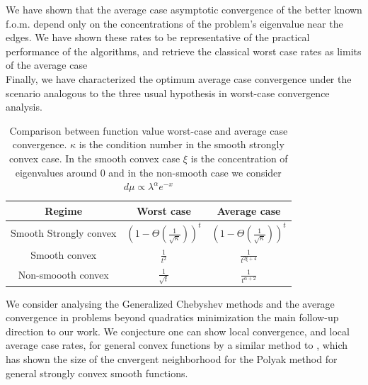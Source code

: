\documentclass{article}
\begin{document}
We have  shown that the average case asymptotic convergence of  the better known f.o.m. depend only on the concentrations of the problem's eigenvalue near the edges. We have shown these rates to be representative of the practical performance of the algorithms, and retrieve the classical worst case rates as limits of the average case\\

Finally, we have characterized the optimum average case convergence under the scenario analogous to the three usual hypothesis in worst-case convergence analysis.

\begin{table}[H]
    \centering
    \begin{tabular}{c|c|c}
         Regime&Worst case& Average case  \\
         \hline
         Smooth Strongly convex & $\left(1-\Theta(\frac{1}{\sqrt{\kappa}})\right)^t$ &
         $\left(1-\Theta(\frac{1}{\sqrt{\kappa}})\right)^t$\\ 
         \hline
         Smooth convex & $\frac{1}{t^2}$ & $\frac{1}{t^{2\xi+4}}$\\
         \hline
         Non-smoooth convex& $\frac{1}{\sqrt{t}}$ & $\frac{1}{t^{\alpha+2}}$
    \end{tabular}
    \caption{Comparison between function value worst-case and average case convergence. $\kappa$ is the condition number in the smooth strongly convex case. In the smooth convex case $\xi$ is the concentration of eigenvalues around $0$ and in the non-smooth case we consider $d\mu\propto \lambda^\alpha e^{-x}$ }
    \label{tab:my_label}
\end{table}
We consider analysing the Generalized Chebyshev methods and the average convergence in problems beyond quadratics minimization the main follow-up direction to our work. We conjecture one can show local convergence, and local average case rates, for general convex functions by a similar method to \cite{wang2021modular}, which has shown the size of the cnvergent neighborhood for the Polyak method for general strongly convex smooth functions.
\newpage



\appendix
\newpage
\end{document}
